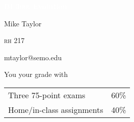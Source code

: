 \documentclass[t]{beamer}
\begin{document}
	

{
	\begin{frame}[t]{\textcolor{white}{\textbf{BI 300: Evolution}}}
\end{frame}
}

{
\begin{frame}[t,plain]
\large
\vspace{5ex}
\hangpara\hspace{17em} Mike Taylor

\hangpara\hspace{17em} \textsc{rh} 217

\hangpara\hspace{17em} mtaylor@semo.edu


\end{frame}
}



%
%
%
%
%


\begin{frame}[t]{You  your grade with}
	\begin{center}\large\begin{tabular}{@{}ll@{}}
	Three 75-point exams & 60\% \\[1ex]
	Home/in-class assignments & 40\% \\
	\end{tabular}
	\end{center}
\end{frame}
\end{document}
